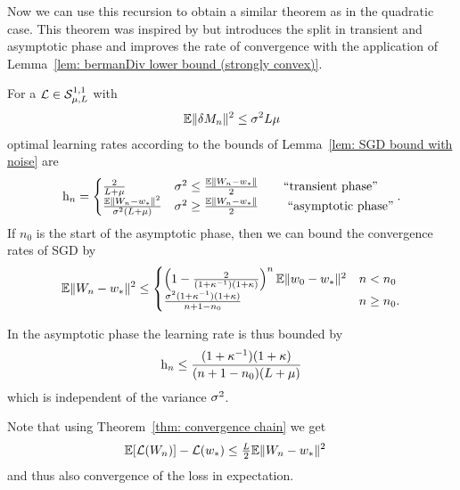 Now we can use this recursion to obtain a similar theorem as in the quadratic
case. This theorem was inspired by
\textcite{nemirovskiRobustStochasticApproximation2009} but introduces the split
in transient and asymptotic phase and improves the rate of convergence with the
application of Lemma~\ref{lem: bermanDiv lower bound (strongly convex)}.

\begin{theorem}\label{thm: optimal rates SGD}
	For a \(\mathcal{L}\in\mathcal{S}^{1,1}_{{\mu},{L}}\) with
	\begin{align*}
		\mathbb{E}\|\delta M_n\|^2 \le \sigma^2L\mu
	\end{align*}
	optimal learning rates according to the bounds of Lemma~\ref{lem: SGD bound with noise} are
	\begin{align*}
		\text{h}_n
		= \begin{cases}
			\frac{2}{L+\mu}
			& \sigma^2 \le \frac{\mathbb{E}\|W_n - w_*\|}{2}
			\qquad \text{``transient phase''}\\
			\frac{\mathbb{E}\|W_n -w_*\|^2}{\sigma^2(L+\mu)}
			& \sigma^2 \ge \frac{\mathbb{E}\|W_n - w_*\|}{2}
			\qquad \text{ ``asymptotic phase''}
		\end{cases}.
	\end{align*}
	If \(n_0\) is the start of the asymptotic phase, then we can bound the
	convergence rates of SGD by
	\begin{align*}
		\mathbb{E}\|W_n - w_*\|^2
		\le \begin{cases}
			\left(1-\frac{2}{(1+\kappa^{-1})(1+\kappa)}\right)^n\mathbb{E}\|w_0 -w_*\|^2
			& n < n_0\\
			\frac{\sigma^2(1+\kappa^{-1})(1+\kappa)}{n+1-n_0} & n \ge n_0.
		\end{cases}
	\end{align*}
\end{theorem}
\begin{remark}
	In the asymptotic phase the learning rate is thus bounded by
	\begin{align*}
		\text{h}_n \le \frac{(1+\kappa^{-1})(1+\kappa)}{(n+1-n_0)(L + \mu)}
	\end{align*}
	which is independent of the variance \(\sigma^2\).
\end{remark}
\begin{remark}\label{rem: expected loss is a special case of L2 weight convergence}
	Note that using Theorem~\ref{thm: convergence chain} we get
	\begin{align*}
		\mathbb{E}[\mathcal{L}(W_n)]- \mathcal{L}(w_*)
		&\le \tfrac{L}{2}\mathbb{E}\|W_n-w_*\|^2
	\end{align*}
	and thus also convergence of the loss in expectation.
\end{remark}

